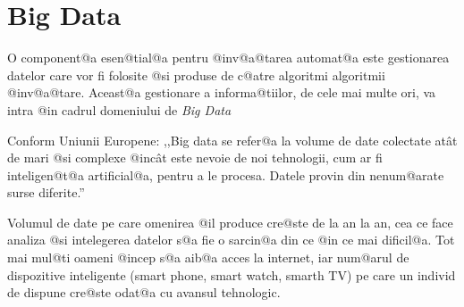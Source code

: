 \section{Big Data}

O component@a esen@tial@a pentru @inv@a@tarea automat@a este gestionarea datelor care vor fi folosite @si produse de c@atre algoritmi algoritmii @inv@a@tare. Aceast@a gestionare a informa@tiilor, de cele mai multe ori, va intra @in cadrul domeniului de {\sl Big Data }

Conform Uniunii Europene: ,,Big data se refer@a la volume de date colectate at\^ at de mari @si complexe @inc\^ at este nevoie de noi tehnologii, cum ar fi inteligen@t@a artificial@a, pentru a le procesa. Datele provin din nenum@arate surse diferite.''\cite{eu-big-data-definition}

Volumul de date pe care omenirea @il produce cre@ste de la an la an, cea ce face  analiza @si intelegerea datelor s@a fie o sarcin@a din ce @in ce mai dificil@a. Tot mai mul@ti oameni @incep s@a aib@a acces la internet, iar num@arul de dispozitive inteligente (smart phone, smart watch, smarth TV) pe care un individ de dispune cre@ste odat@a cu avansul tehnologic.

